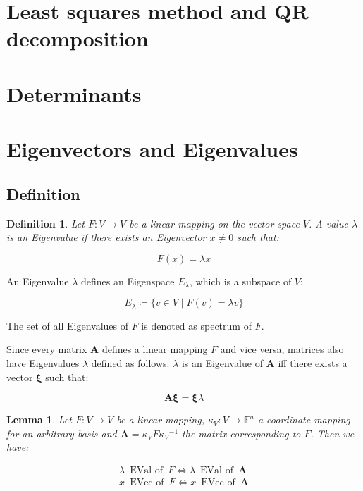 \documentclass[a4paper,12pt]{article}
\newcommand{\defas}{\coloneqq}
\newcommand{\E}{\mathbb{E}}
\newcommand{\A}{\mat{A}}
\newcommand{\Er}{E_{\lambda}}
\newcommand{\mat}[1]{\mathbf{#1}}
\newcommand{\inv}[1]{{#1}^{-1}}
\let\oldxi\xi
\renewcommand{\xi}{\mathbf{\oldxi}}
\theoremstyle{plain}
\newtheorem{defn}{Definition}[section]
\newtheorem{lemma}{Lemma}[section]
\numberwithin{equation}{section}
\begin{document}
\section{Least squares method and QR decomposition}

\section{Determinants}

\section{Eigenvectors and Eigenvalues}

\subsection{Definition}

\begin{defn}
\label{eigenvalue}
    Let $F \colon V \rightarrow V$ be a linear mapping on the vector space $V$.
    A value $\lambda$ is an Eigenvalue if there exists an Eigenvector $x \neq 0$
    such that:

    \begin{equation}
        F(x) = \lambda x
    \end{equation}
\end{defn}

An Eigenvalue $\lambda$ defines an Eigenspace $\Er$, which is a subspace
of $V$:

\begin{equation}
    \Er \defas \{ v \in V \mid F(v) = \lambda v \}
\end{equation}

The set of all Eigenvalues of $F$ is denoted as spectrum of $F$.

Since every matrix $\A$ defines a linear mapping $F$ and vice versa,
matrices also have Eigenvalues $\lambda$ defined as follows: $\lambda$ is
an Eigenvalue of $\A$ iff there exists a vector $\xi$ such that:

\begin{equation}
    \A \xi = \xi \lambda
\end{equation}

\begin{lemma}
\label{lem:equiv-map-mat}
    Let $F \colon V \rightarrow V$ be a linear mapping,
    $\kappa_{V} \colon V \rightarrow \E^{n}$ a coordinate mapping for an
    arbitrary basis and $\A = \kappa_{V} F \inv{\kappa_{V}}$ the matrix
    corresponding to $F$. Then we have:

    \begin{equation*}
        \begin{gathered}
            \lambda \enspace \text{EVal of} \enspace F
                \iff \lambda \enspace \text{EVal of} \enspace \A \\
            x \enspace \text{EVec of} \enspace F
                \iff x \enspace \text{EVec of} \enspace \A
        \end{gathered}
    \end{equation*}
\end{lemma}
\end{document}
